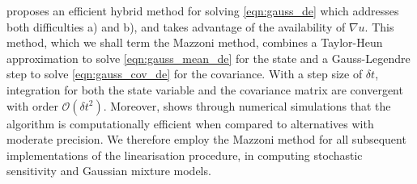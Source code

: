 \citet{Mazzoni_2008_ComputationalAspectsContinuous} proposes an efficient hybrid method for solving \eqref{eqn:gauss_de} which addresses both difficulties a) and b), and takes advantage of the availability of \(\nabla u\).
This method, which we shall term the Mazzoni method, combines a Taylor-Heun approximation to solve \eqref{eqn:gauss_mean_de} for the state and a Gauss-Legendre step to solve \eqref{eqn:gauss_cov_de} for the covariance.
With a step size of \(\delta t\), integration for both the state variable and the covariance matrix are convergent with order \(\mathcal{O}\!\left(\delta t^2\right)\).
Moreover, \citet{Mazzoni_2008_ComputationalAspectsContinuous} shows through numerical simulations that the algorithm is computationally efficient when compared to alternatives with moderate precision.
We therefore employ the Mazzoni method for all subsequent implementations of the linearisation procedure, in computing stochastic sensitivity and Gaussian mixture models.

